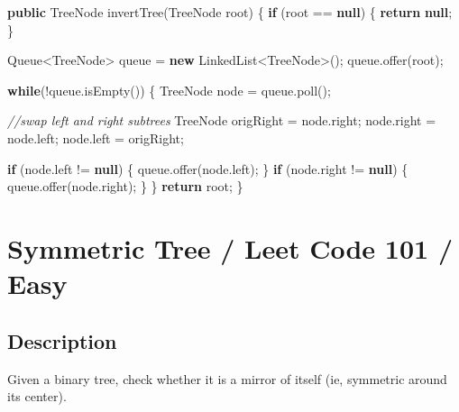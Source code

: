 \documentclass[]{book}
\newenvironment{Shaded}{\begin{snugshade}}{\end{snugshade}}
\newcommand{\BuiltInTok}[1]{#1}
\newcommand{\CommentTok}[1]{\textcolor[rgb]{0.56,0.35,0.01}{\textit{#1}}}
\newcommand{\FunctionTok}[1]{\textcolor[rgb]{0.00,0.00,0.00}{#1}}
\newcommand{\KeywordTok}[1]{\textcolor[rgb]{0.13,0.29,0.53}{\textbf{#1}}}
\newcommand{\NormalTok}[1]{#1}
\begin{document}
\begin{Shaded}
\begin{Highlighting}[]
\KeywordTok{public} \BuiltInTok{TreeNode} \FunctionTok{invertTree}\NormalTok{(}\BuiltInTok{TreeNode}\NormalTok{ root) \{}
    \KeywordTok{if}\NormalTok{ (root == }\KeywordTok{null}\NormalTok{) \{}
        \KeywordTok{return} \KeywordTok{null}\NormalTok{;}
\NormalTok{    \}}

    \BuiltInTok{Queue}\NormalTok{<}\BuiltInTok{TreeNode}\NormalTok{> queue = }\KeywordTok{new} \BuiltInTok{LinkedList}\NormalTok{<}\BuiltInTok{TreeNode}\NormalTok{>();}
\NormalTok{    queue.}\FunctionTok{offer}\NormalTok{(root);}

    \KeywordTok{while}\NormalTok{(!queue.}\FunctionTok{isEmpty}\NormalTok{()) \{}
        \BuiltInTok{TreeNode}\NormalTok{ node = queue.}\FunctionTok{poll}\NormalTok{();}

        \CommentTok{//swap left and right subtrees}
        \BuiltInTok{TreeNode}\NormalTok{ origRight = node.}\FunctionTok{right}\NormalTok{;}
\NormalTok{        node.}\FunctionTok{right}\NormalTok{ = node.}\FunctionTok{left}\NormalTok{;}
\NormalTok{        node.}\FunctionTok{left}\NormalTok{ = origRight;}

        \KeywordTok{if}\NormalTok{ (node.}\FunctionTok{left}\NormalTok{ != }\KeywordTok{null}\NormalTok{) \{}
\NormalTok{            queue.}\FunctionTok{offer}\NormalTok{(node.}\FunctionTok{left}\NormalTok{);}
\NormalTok{        \}}
        \KeywordTok{if}\NormalTok{ (node.}\FunctionTok{right}\NormalTok{ != }\KeywordTok{null}\NormalTok{) \{}
\NormalTok{            queue.}\FunctionTok{offer}\NormalTok{(node.}\FunctionTok{right}\NormalTok{);}
\NormalTok{        \}}
\NormalTok{    \}}
    \KeywordTok{return}\NormalTok{ root;}
\NormalTok{\}}
\end{Highlighting}
\end{Shaded}

\hypertarget{symmetric-tree-leet-code-101-easy}{%
\section{Symmetric Tree / Leet Code 101 / Easy}\label{symmetric-tree-leet-code-101-easy}}

\hypertarget{description-53}{%
\subsection{Description}\label{description-53}}

Given a binary tree, check whether it is a mirror of itself (ie, symmetric around its center).
\end{document}
